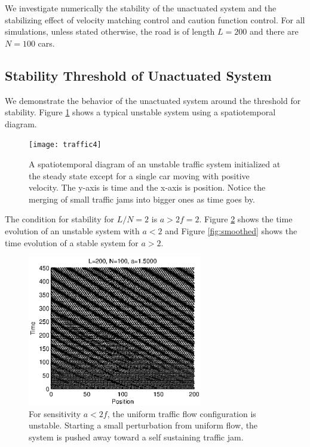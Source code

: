 \documentclass[10pt,twocolumn]{article}
\theoremstyle{ss}
\begin{document}
We investigate numerically the stability of the unactuated system and the stabilizing effect of velocity matching control and caution function control. For all simulations, unless stated otherwise, the road is of length $L=200$ and there are $N=100$ cars.

\subsection{Stability Threshold of Unactuated System}
We demonstrate the behavior of the unactuated system around the threshold for stability. Figure \ref{fig:instability2} shows a typical unstable system using a spatiotemporal diagram.

\begin{figure}[!h]
\begin{center}
\texttt{[image: traffic4]}
\end{center}
\caption{ \label{fig:instability2} A spatiotemporal diagram of an unstable traffic system initialized at the steady state except for a single car moving with positive velocity. The y-axis is time and the x-axis is position. Notice the merging of small traffic jams into bigger ones as time goes by.}
\end{figure}

The condition for stability for $L/N=2$ is $a > 2f = 2$. Figure \ref{fig:instability} shows the time evolution of an unstable system with $a<2$ and Figure \ref{fig:smoothed} shows the time evolution of a stable system for $a>2$.

\begin{figure}[!h]
\begin{center}
\includegraphics[width=3in]{instability}
\end{center}
\caption{ \label{fig:instability} For sensitivity $a<2f$, the uniform traffic flow configuration is unstable. Starting a small perturbation from uniform flow, the system is pushed away toward a self sustaining traffic jam.}
\end{figure}
\end{document}
